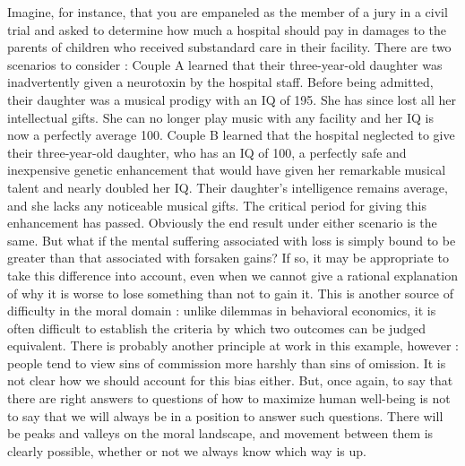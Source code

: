 \documentclass[a4paper,14pt]{extbook}
\begin{document}
Imagine, for instance, that you are empaneled as the member of a jury in a civil trial and asked to determine how much a hospital should pay in damages to the parents of children who received substandard care in their facility.
There are two scenarios to consider :
Couple A learned that their three-year-old daughter was inadvertently given a neurotoxin by the hospital staff.
Before being admitted, their daughter was a musical prodigy with an IQ of 195.
She has since lost all her intellectual gifts.
She can no longer play music with any facility and her IQ is now a perfectly average 100.
Couple B learned that the hospital neglected to give their three-year-old daughter, who has an IQ of 100, a perfectly safe and inexpensive genetic enhancement that would have given her remarkable musical talent and nearly doubled her IQ.
Their daughter's intelligence remains average, and she lacks any noticeable musical gifts.
The critical period for giving this enhancement has passed.
Obviously the end result under either scenario is the same.
But what if the mental suffering associated with loss is simply bound to be greater than that associated with forsaken gains?
If so, it may be appropriate to take this difference into account, even when we cannot give a rational explanation of why it is worse to lose something than not to gain it.
This is another source of difficulty in the moral domain :
unlike dilemmas in behavioral economics, it is often difficult to establish the criteria by which two outcomes can be judged equivalent.
There is probably another principle at work in this example, however :
people tend to view sins of commission more harshly than sins of omission.
It is not clear how we should account for this bias either.
But, once again, to say that there are right answers to questions of how to maximize human well-being is not to say that we will always be in a position to answer such questions.
There will be peaks and valleys on the moral landscape, and movement between them is clearly possible, whether or not we always know which way is up.
\end{document}
